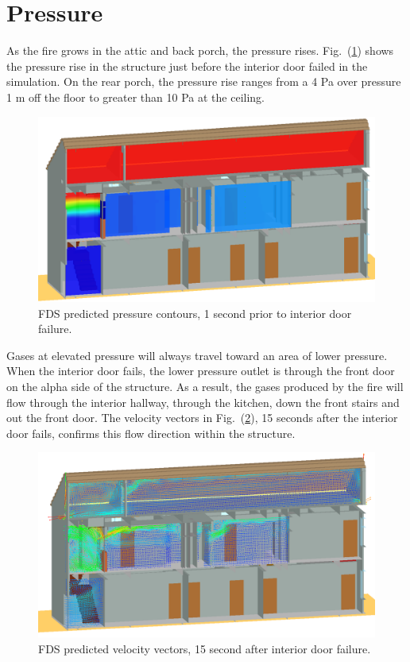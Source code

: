 \documentclass[11pt,oneside]{book}
\begin{document}
\section{Pressure}
As the fire grows in the attic and back porch, the pressure rises. Fig.~(\ref{fig:pres_159s}) shows the pressure rise in the structure just before the interior door failed in the simulation. On the rear porch, the pressure rise ranges from a 4 Pa over pressure 1 m off the floor to greater than 10 Pa at the ceiling.
\begin{figure}[!ht]
\includegraphics[width=.75\textwidth]{../Figures/west_50th_baseline_pres2}

\caption{FDS predicted pressure contours, 1 second prior to interior door failure.}
\label{fig:pres_159s}
\end{figure}
Gases at elevated pressure will always travel toward an area of lower pressure. When the interior door fails, the lower pressure outlet is through the front door on the alpha side of the structure. As a result, the gases produced by the fire will flow through the interior hallway, through the kitchen, down the front stairs and out the front door. The velocity vectors in Fig.~(\ref{fig:velo_175s}), 15 seconds after the interior door fails, confirms this flow direction within the structure.
\begin{figure}[!ht]
\includegraphics[width=.675\textwidth]{../Figures/west_50th_baseline_velo_175}


\caption{FDS predicted velocity vectors, 15 second after interior door failure.}
\label{fig:velo_175s}
\end{figure}
\end{document}
